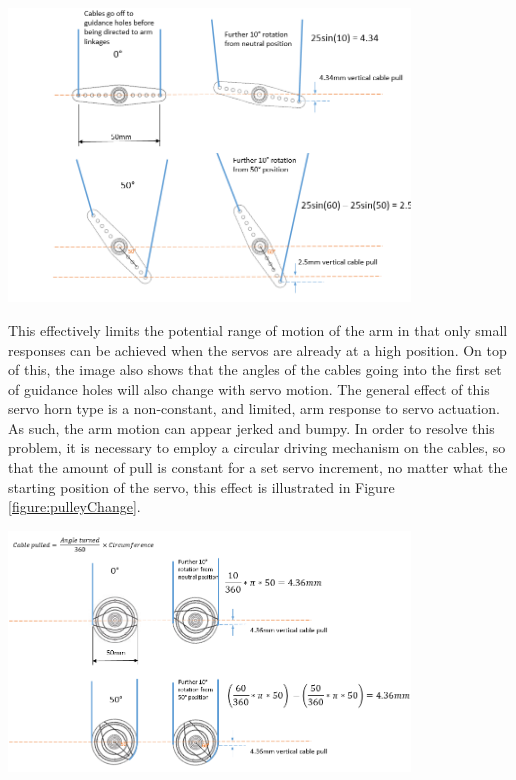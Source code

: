 \documentclass[11pt]{article}
\begin{document}
\begin{center}
\includegraphics[width=0.8\textwidth]{images/servoArmChange.png}
\label{figure:servoArmChange}
\end{center}

This effectively limits the potential range of motion of the arm in that only small responses can be achieved when the servos are already at a high position. On top of this, the image also shows that the angles of the cables going into the first set of guidance holes will also change with servo motion. The general effect of this servo horn type is a non-constant, and limited, arm response to servo actuation. As such, the arm motion can appear jerked and bumpy. In order to resolve this problem, it is necessary to employ a circular driving mechanism on the cables, so that the amount of pull is constant for a set servo increment, no matter what the starting position of the servo, this effect is illustrated in Figure \ref{figure:pulleyChange}.
 
\begin{center}
\includegraphics[width=0.8\textwidth]{images/pulleyChange.png}
\label{figure:pulleyChange}
\end{center}
 
\end{document}
